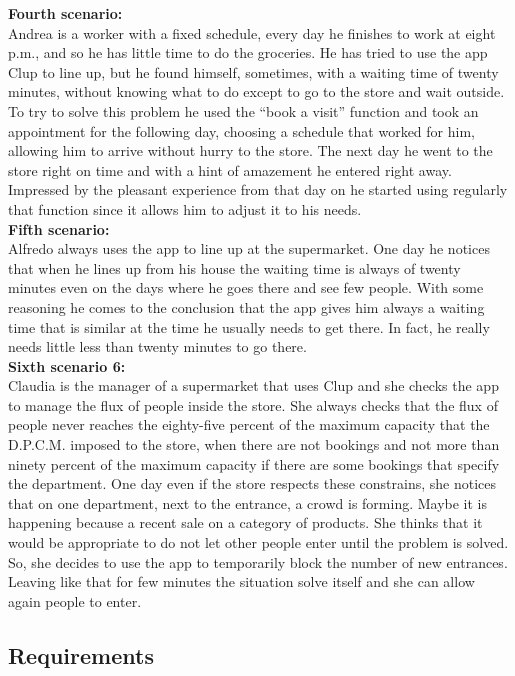 \textbf{Fourth scenario:}\\
Andrea is a worker with a fixed schedule, every day he finishes to work at eight p.m., and so he has little time to do the groceries. He has tried to use the app Clup to line up, but he found himself, sometimes, with a waiting time of twenty minutes, without knowing what to do except to go to the store and wait outside. To try to solve this problem he used the “book a visit” function and took an appointment for the following day, choosing a schedule that worked for him, allowing him to arrive without hurry to the store. The next day he went to the store right on time and with a hint of amazement he entered right away. Impressed by the pleasant experience from that day on he started using regularly that function since it allows him to adjust it to his needs.\\


\textbf{Fifth scenario:}\\
Alfredo always uses the app to line up at the supermarket. One day he notices that when he lines up from his house the waiting time is always of twenty minutes even on the days where he goes there and see few people. With some reasoning he comes to the conclusion that the app gives him always a waiting time that is similar at the time he usually needs to get there. In fact, he really needs little less than twenty minutes to go there.\\


\textbf{Sixth scenario 6:}\\
Claudia is the manager of a supermarket that uses Clup and she checks the app to manage the flux of people inside the store. She always checks that the flux of people never reaches the eighty-five percent of the maximum capacity that the D.P.C.M. imposed to the store, when there are not bookings and not more than ninety percent of the maximum capacity if there are some bookings that specify the department. 
One day even if the store respects these constrains, she notices that on one department, next to the entrance, a crowd is forming. Maybe it is happening because a recent sale on a category of products. She thinks that it would be appropriate to do not let other people enter until the problem is solved. So, she decides to use the app to temporarily block the number of new entrances. Leaving like that for few minutes the situation solve itself and she can allow again people to enter.\\


\subsection{Requirements}

